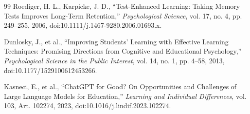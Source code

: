 \documentclass[12pt]{report}
\begin{document}
\begin{thebibliography}{99}
 Roediger, H. L., Karpicke, J. D., ``Test-Enhanced Learning: Taking Memory Tests Improves Long-Term Retention,'' \textit{Psychological Science}, vol. 17, no. 4, pp. 249--255, 2006, doi:10.1111/j.1467-9280.2006.01693.x.

 Dunlosky, J., et al., ``Improving Students' Learning with Effective Learning Techniques: Promising Directions from Cognitive and Educational Psychology,'' \textit{Psychological Science in the Public Interest}, vol. 14, no. 1, pp. 4--58, 2013, doi:10.1177/1529100612453266.

 Kasneci, E., et al., ``ChatGPT for Good? On Opportunities and Challenges of Large Language Models for Education,'' \textit{Learning and Individual Differences}, vol. 103, Art. 102274, 2023, doi:10.1016/j.lindif.2023.102274.

\end{thebibliography}
\end{document}
